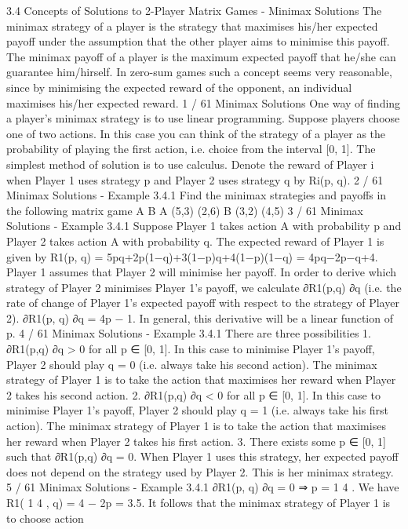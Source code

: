 3.4 Concepts of Solutions to 2-Player Matrix Games -
Minimax Solutions
The minimax strategy of a player is the strategy that maximises
his/her expected payoff under the assumption that the other player
aims to minimise this payoff.
The minimax payoff of a player is the maximum expected payoff
that he/she can guarantee him/hirself.
In zero-sum games such a concept seems very reasonable, since by
minimising the expected reward of the opponent, an individual
maximises his/her expected reward.
1 / 61
Minimax Solutions
One way of finding a player’s minimax strategy is to use linear
programming.
Suppose players choose one of two actions. In this case you can
think of the strategy of a player as the probability of playing the
first action, i.e. choice from the interval [0, 1]. The simplest
method of solution is to use calculus.
Denote the reward of Player i when Player 1 uses strategy p and
Player 2 uses strategy q by Ri(p, q).
2 / 61
Minimax Solutions - Example 3.4.1
Find the minimax strategies and payoffs in the following matrix
game
A B
A (5,3) (2,6)
B (3,2) (4,5)
3 / 61
Minimax Solutions - Example 3.4.1
Suppose Player 1 takes action A with probability p and Player 2
takes action A with probability q. The expected reward of Player 1
is given by
R1(p, q) = 5pq+2p(1−q)+3(1−p)q+4(1−p)(1−q) = 4pq−2p−q+4.
Player 1 assumes that Player 2 will minimise her payoff. In order to
derive which strategy of Player 2 minimises Player 1’s payoff, we
calculate ∂R1(p,q)
∂q
(i.e. the rate of change of Player 1’s expected
payoff with respect to the strategy of Player 2).
∂R1(p, q)
∂q
= 4p − 1.
In general, this derivative will be a linear function of p.
4 / 61
Minimax Solutions - Example 3.4.1
There are three possibilities
1. ∂R1(p,q)
∂q > 0 for all p ∈ [0, 1]. In this case to minimise
Player 1’s payoff, Player 2 should play q = 0 (i.e.
always take his second action). The minimax strategy
of Player 1 is to take the action that maximises her
reward when Player 2 takes his second action.
2. ∂R1(p,q)
∂q < 0 for all p ∈ [0, 1]. In this case to minimise
Player 1’s payoff, Player 2 should play q = 1 (i.e.
always take his first action). The minimax strategy of
Player 1 is to take the action that maximises her
reward when Player 2 takes his first action.
3. There exists some p ∈ [0, 1] such that ∂R1(p,q)
∂q = 0.
When Player 1 uses this strategy, her expected payoff
does not depend on the strategy used by Player 2.
This is her minimax strategy.
5 / 61
Minimax Solutions - Example 3.4.1
∂R1(p, q)
∂q
= 0 ⇒ p =
1
4
.
We have
R1(
1
4
, q) = 4 − 2p = 3.5.
It follows that the minimax strategy of Player 1 is to choose action
